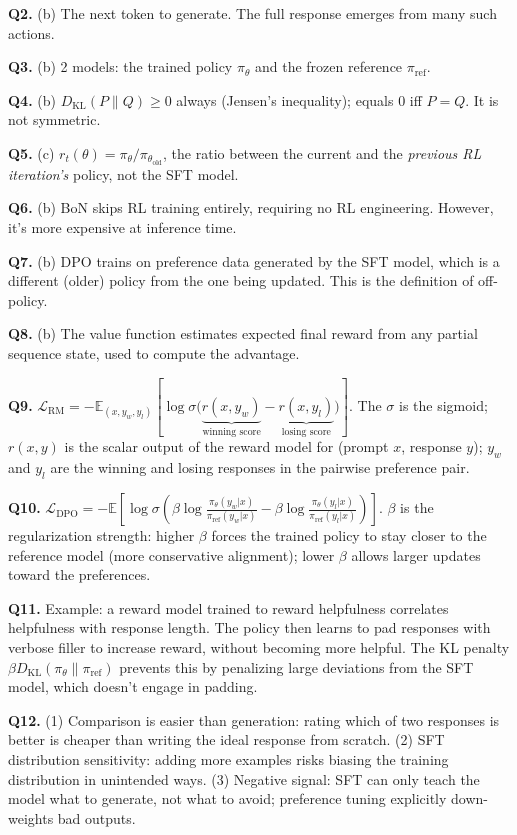 \documentclass[11pt, a4paper]{article}
\begin{document}
\textbf{Q2.} (b) The next token to generate. The full response emerges from many such actions.

\textbf{Q3.} (b) 2 models: the trained policy $\pi_\theta$ and the frozen reference $\pi_{\text{ref}}$.

\textbf{Q4.} (b) $D_{\text{KL}}(P\|Q) \geq 0$ always (Jensen's inequality); equals 0 iff $P = Q$. It is not symmetric.

\textbf{Q5.} (c) $r_t(\theta) = \pi_\theta / \pi_{\theta_\text{old}}$, the ratio between the current and the \emph{previous RL iteration's} policy, not the SFT model.

\textbf{Q6.} (b) BoN skips RL training entirely, requiring no RL engineering. However, it's more expensive at inference time.

\textbf{Q7.} (b) DPO trains on preference data generated by the SFT model, which is a different (older) policy from the one being updated. This is the definition of off-policy.

\textbf{Q8.} (b) The value function estimates expected final reward from any partial sequence state, used to compute the advantage.

\textbf{Q9.} $\mathcal{L}_{\text{RM}} = -\mathbb{E}_{(x,y_w,y_l)}\left[\log \sigma\!\big(\underbrace{r(x,y_w)}_{\text{winning score}} - \underbrace{r(x,y_l)}_{\text{losing score}}\big)\right]$. The $\sigma$ is the sigmoid; $r(x,y)$ is the scalar output of the reward model for (prompt $x$, response $y$); $y_w$ and $y_l$ are the winning and losing responses in the pairwise preference pair.

\textbf{Q10.} $\mathcal{L}_{\text{DPO}} = -\mathbb{E}\!\left[\log \sigma\!\left(\beta \log \frac{\pi_\theta(y_w|x)}{\pi_{\text{ref}}(y_w|x)} - \beta \log \frac{\pi_\theta(y_l|x)}{\pi_{\text{ref}}(y_l|x)}\right)\right]$. $\beta$ is the regularization strength: higher $\beta$ forces the trained policy to stay closer to the reference model (more conservative alignment); lower $\beta$ allows larger updates toward the preferences.

\textbf{Q11.} Example: a reward model trained to reward helpfulness correlates helpfulness with response length. The policy then learns to pad responses with verbose filler to increase reward, without becoming more helpful. The KL penalty $\beta D_{\text{KL}}(\pi_\theta \| \pi_{\text{ref}})$ prevents this by penalizing large deviations from the SFT model, which doesn't engage in padding.

\textbf{Q12.} (1) Comparison is easier than generation: rating which of two responses is better is cheaper than writing the ideal response from scratch. (2) SFT distribution sensitivity: adding more examples risks biasing the training distribution in unintended ways. (3) Negative signal: SFT can only teach the model what to generate, not what to avoid; preference tuning explicitly down-weights bad outputs.
\end{document}
